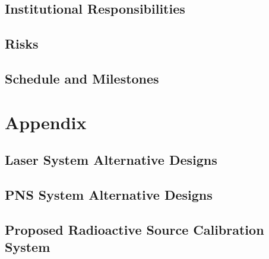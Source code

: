 \subsection{Institutional Responsibilities}
\label{sec:sp-calib-resp}


%

\subsection{Risks}
\label{sec:sp-calib-risks}


\subsection{Schedule and Milestones}
\label{sec:sp-calib-sched}



\newpage


\section{Appendix}
\label{appx:calibration}
\subsection{Laser System Alternative Designs}
\label{sec:sp-calib-laser-alter}


\subsection{PNS System Alternative Designs}
\label{sec:sp-calib-pns-alter}


\subsection{Proposed Radioactive Source Calibration System}
\label{sec:sp-calib-sys-rsds}


